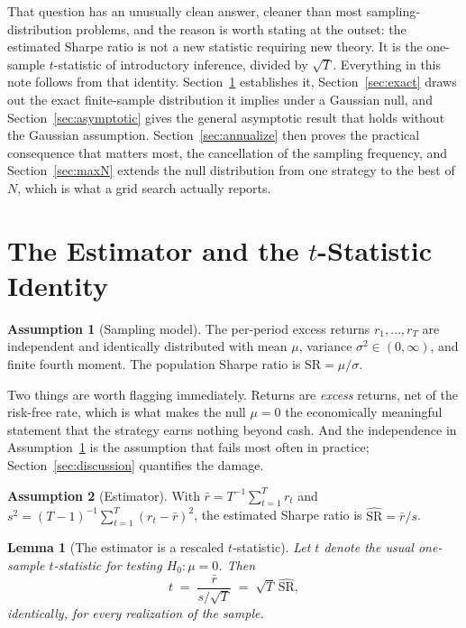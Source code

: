 \documentclass[11pt]{article}
\newtheorem{lemma}{Lemma}
\theoremstyle{remark}
\theoremstyle{definition}
\newtheorem{assumption}{Assumption}
\newcommand{\SR}{\text{SR}}
\newcommand{\SRhat}{\widehat{\text{SR}}}
\begin{document}
That question has an unusually clean answer, cleaner than most sampling-distribution problems, and the reason is worth stating at the outset: the estimated Sharpe ratio is not a new statistic requiring new theory. It is the one-sample $t$-statistic of introductory inference, divided by $\sqrt{T}$. Everything in this note follows from that identity. Section~\ref{sec:identity} establishes it, Section~\ref{sec:exact} draws out the exact finite-sample distribution it implies under a Gaussian null, and Section~\ref{sec:asymptotic} gives the general asymptotic result that holds without the Gaussian assumption. Section~\ref{sec:annualize} then proves the practical consequence that matters most, the cancellation of the sampling frequency, and Section~\ref{sec:maxN} extends the null distribution from one strategy to the best of $N$, which is what a grid search actually reports.

\section{The Estimator and the \texorpdfstring{$t$}{t}-Statistic Identity}
\label{sec:identity}

\begin{assumption}[Sampling model]
\label{ass:iid}
The per-period excess returns $r_1,\dots,r_T$ are independent and identically distributed with mean $\mu$, variance $\sigma^2 \in (0,\infty)$, and finite fourth moment. The population Sharpe ratio is $\SR = \mu/\sigma$.
\end{assumption}

Two things are worth flagging immediately. Returns are \emph{excess} returns, net of the risk-free rate, which is what makes the null $\mu=0$ the economically meaningful statement that the strategy earns nothing beyond cash. And the independence in Assumption~\ref{ass:iid} is the assumption that fails most often in practice; Section~\ref{sec:discussion} quantifies the damage.

\begin{assumption}[Estimator]
\label{ass:est}
With $\bar r = T^{-1}\sum_{t=1}^T r_t$ and $s^2 = (T-1)^{-1}\sum_{t=1}^T (r_t - \bar r)^2$, the estimated Sharpe ratio is $\SRhat = \bar r / s$.
\end{assumption}

\begin{lemma}[The estimator is a rescaled $t$-statistic]
\label{lem:identity}
Let $t$ denote the usual one-sample $t$-statistic for testing $H_0\!:\mu = 0$. Then
\begin{equation}
\label{eq:identity}
t \;=\; \frac{\bar r}{s/\sqrt{T}} \;=\; \sqrt{T}\,\SRhat,
\end{equation}
identically, for every realization of the sample.
\end{lemma}
\end{document}
